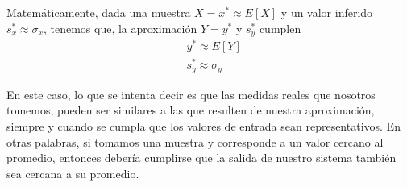 \documentclass[a4paper, 10pt]{article}
\begin{document}
Matemáticamente, dada una muestra $X = x^{*} \approx E[X]$ y un valor inferido $s_x^{*} \approx \sigma_x$,
tenemos que, la aproximación $Y = y^{*}$ y $s_y^{*}$ cumplen
\begin{equation}
    \begin{split}
        &y^{*} \approx E[Y] \\
        &s_y^{*} \approx \sigma_y
    \end{split}
\end{equation}

En este caso, lo que se intenta decir es que las medidas reales que nosotros tomemos, pueden ser similares
a las que resulten de nuestra aproximación, siempre y cuando se cumpla que los valores de entrada sean representativos.
En otras palabras, si tomamos una muestra y corresponde a un valor cercano al promedio, entonces debería cumplirse
que la salida de nuestro sistema también sea cercana a su promedio.
\end{document}
